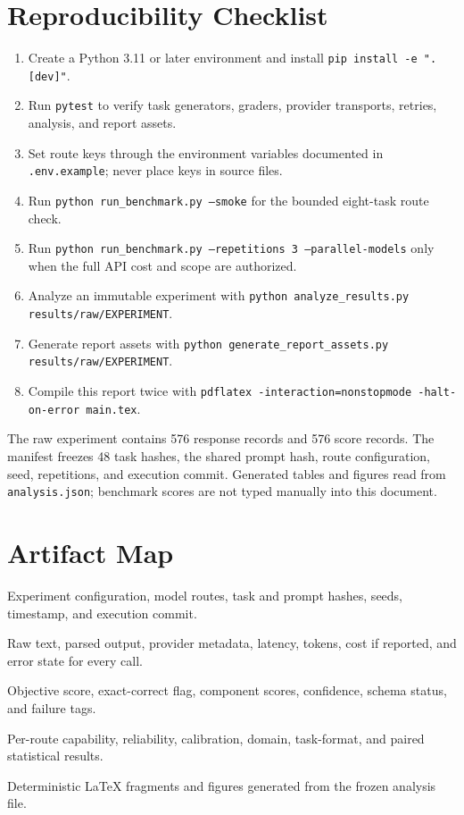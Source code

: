 \documentclass[11pt]{article}
\begin{document}
\section{Reproducibility Checklist}

\begin{enumerate}
    \item Create a Python 3.11 or later environment and install \texttt{pip install -e ".[dev]"}.
    \item Run \texttt{pytest} to verify task generators, graders, provider transports, retries, analysis, and report assets.
    \item Set route keys through the environment variables documented in \texttt{.env.example}; never place keys in source files.
    \item Run \texttt{python run\_benchmark.py --smoke} for the bounded eight-task route check.
    \item Run \texttt{python run\_benchmark.py --repetitions 3 --parallel-models} only when the full API cost and scope are authorized.
    \item Analyze an immutable experiment with \texttt{python analyze\_results.py results/raw/EXPERIMENT}.
    \item Generate report assets with \texttt{python generate\_report\_assets.py results/raw/EXPERIMENT}.
    \item Compile this report twice with \texttt{pdflatex -interaction=nonstopmode -halt-on-error main.tex}.
\end{enumerate}

The raw experiment contains 576 response records and 576 score records. The manifest freezes 48 task hashes, the shared prompt hash, route configuration, seed, repetitions, and execution commit. Generated tables and figures read from \texttt{analysis.json}; benchmark scores are not typed manually into this document.

\section{Artifact Map}

\begin{description}[leftmargin=2.7cm,style=nextline]
    \item[Manifest] Experiment configuration, model routes, task and prompt hashes, seeds, timestamp, and execution commit.
    \item[Responses] Raw text, parsed output, provider metadata, latency, tokens, cost if reported, and error state for every call.
    \item[Scores] Objective score, exact-correct flag, component scores, confidence, schema status, and failure tags.
    \item[Analysis] Per-route capability, reliability, calibration, domain, task-format, and paired statistical results.
    \item[Report assets] Deterministic LaTeX fragments and figures generated from the frozen analysis file.
\end{description}
\end{document}
